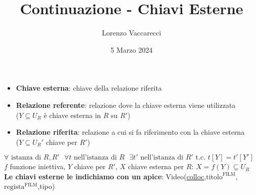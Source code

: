\documentclass[12pt]{article}
\title{Continuazione - Chiavi Esterne}
\author{Lorenzo Vaccarecci}
\date{5 Marzo 2024}
\begin{document}
\maketitle
\begin{itemize}
    \item \textbf{Chiave esterna}: chiave della relazione riferita
    \item \textbf{Relazione referente}: relazione dove la chiave esterna viene utilizzata \\(\(Y\subseteq U_{R}\) è chiave esterna in $R$ su $R'$)
    \item \textbf{Relazione riferita}: relazione a cui si fa riferimento con la chiave esterna \\(\(Y\subseteq U_{R}'\) chiave per $R'$)
\end{itemize}
\(\forall \text{ istanza di } R,R' \text{ } \forall t \text{ nell'istanza di } R \text{ }\exists t' \text{ nell'istanza di } R' \text{ t.c. } t\left[Y\right]=t'\left[Y'\right]\)
\\ $f$ funzione iniettiva, $Y$ chiave per $R'$, $X$ chiave esterna per $R$: \(X=f(Y)\subseteq U_{R}\)
\\\textbf{Le chiavi esterne le indichiamo con un apice}: Video(\uline{colloc},\(\text{titolo}^\text{FILM}\),\(\text{regista}^\text{FILM}\),tipo)
\end{document}
